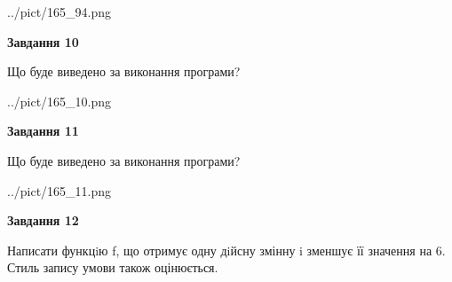 \documentclass[12pt, ukrainian]{article}
\begin{document}
{\begin {large}
\begin{center}
	{../pict/165_94.png}
\end{center}
\newpage

{\begin {center}\textbf{Завдання 10}\end {center}}

Що буде виведено за виконання програми?\par
\begin{center}
	{../pict/165_10.png}
\end{center}
\newpage

{\begin {center}\textbf{Завдання 11}\end {center}}

Що буде виведено за виконання програми?\par
\begin{center}
	{../pict/165_11.png}
\end{center}
\newpage

{\begin {center}\textbf{Завдання 12}\end {center}}


Написати функцiю f, що отримує одну дiйсну змінну i зменшує її значення на 6. Стиль запису умови також оцінюється.\par
\newpage

\end {large}}
\end{document}
